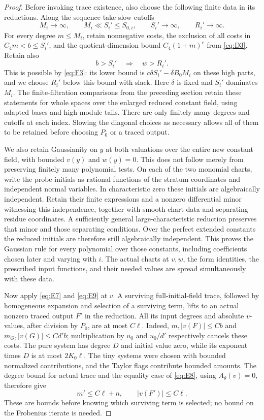 \begin{proof}
Before invoking trace existence, also choose the following finite
data in its reductions.  Along the sequence take slow cutoffs
\[
 M_i\longrightarrow\infty,\qquad
 M_i\ll S_i'\le S_{0,i},\qquad S_i'\longrightarrow\infty,
 \qquad R_i'\longrightarrow\infty.
\]
For every degree $m\le M_i$, retain nonnegative costs, the exclusion of all costs in
$C_4m<b\le S_i'$, and the quotient-dimension bound
$C_4(1+m)^r$ from \eqref{eq:D3}.  Retain also
\[
                 b>S_i'\quad\Longrightarrow\quad w>R_i'.
\]
This is possible by \eqref{eq:F3}: its lower bound is
$c\delta S_i'-\delta B_0M_i$ on these high parts, and we choose
$R_i'$ below this bound with slack.  Here $\delta$ is fixed and
$S_i'$ dominates $M_i$.  The finite-filtration comparisons from
the preceding section retain these statements for whole spaces
over the enlarged reduced constant field, using adapted bases and
high module tails.  There are only finitely many degrees and
cutoffs at each index.  Slowing the diagonal choices as necessary
allows all of them to be retained before choosing $P_0$ or a
traced output.

We also retain Gaussianity on $y$ at both valuations over the
entire new constant field, with bounded $v(y)$ and $w(y)=0$.
This does not follow merely from preserving finitely many polynomial
tests.  On each of the two monomial charts, write the probe initials
as rational functions of the stratum coordinates and independent
normal variables.  In characteristic zero these initials are
algebraically independent.  Retain their finite expressions and a
nonzero differential minor witnessing this independence, together
with smooth chart data and separating residue coordinates.
A sufficiently general large-characteristic reduction preserves
that minor and those separating conditions.  Over the perfect
extended constants the reduced initials are therefore still
algebraically independent.  This proves the Gaussian rule for
every polynomial over those constants, including coefficients
chosen later and varying with $i$.  The actual charts at $v,w$,
the form identities, the prescribed input functions, and their
needed values are spread simultaneously with these data.

Now apply \eqref{eq:E7} and \eqref{eq:E9} at $v$.  A surviving
full-initial-field trace, followed by homogeneous expansion and
selection of a surviving term, lifts to an actual nonzero traced
output $F'$ in the reduction.  All its input degrees and absolute
$v$-values, after division by $P_0$, are at most $C\ell$.
Indeed, $m,|v(F)|\le Cb$ and
$m_G,|v(G)|\le Cd'b$; multiplication by $u_0$ and $u_0/d'$
respectively cancels these costs.  The pure system has degree $D$
and initial value zero, while its exponent times $D$ is at most
$2K_0\ell$.  The tiny systems were chosen with bounded normalized
contributions, and the Taylor flags contribute bounded amounts.
The degree bound for actual trace and the equality case of
\eqref{eq:E8}, using $A_\theta(v)=0$, therefore give
\[
                   m'\le C\ell+n,
                  \qquad |v(F')|\le C\ell.
\]
These are bounds before knowing which surviving term is selected;
no bound on the Frobenius iterate is needed.


\end{proof}
